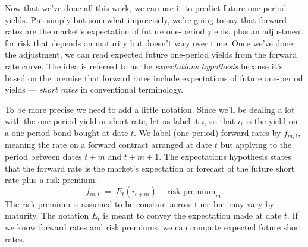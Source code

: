 \documentclass[letterpaper,12pt]{article}
\begin{document}
Now that we've done all this work, we can use it to predict future
one-period yields.  Put simply but somewhat imprecisely, we're
going to say that forward rates are the market's expectation of
future one-period yields, plus an adjustment for risk that depends
on maturity but doesn't vary over time.  Once we've done the
adjustment, we can read expected future one-period yields from the
forward rate curve. The idea is referred to as the {\it
expectations hypothesis\/} because it's based on the premise that
forward rates include expectations of future one-period yields ---
{\it short rates\/} in conventional terminology.

To be more precise we need to add a little notation. Since we'll be dealing a lot with the
one-period yield or short rate, let us label it $i$, so that $i_t$ is the yield on a one-period
bond bought at date $t$. We label (one-period) forward rates by $f_{m,t}$, meaning the rate on a
forward contract arranged at date $t$ but applying to the period between dates $t+m$ and $t+m+1$.
The expectations hypothesis states that the forward rate is the market's expectation or forecast
of the future short rate plus a risk premium:
\begin{equation}
    f_{m,t} \;=\; E_t (i_{t+m}) + \mbox{risk premium}_m .
    \label{eq:eh}
\end{equation}
The risk premium is assumed to be constant across time but may
vary by maturity.  The notation $E_t$ is meant to convey the
expectation made at date $t$.  If we know forward rates and risk
premiums, we can compute expected future short rates.
\end{document}
